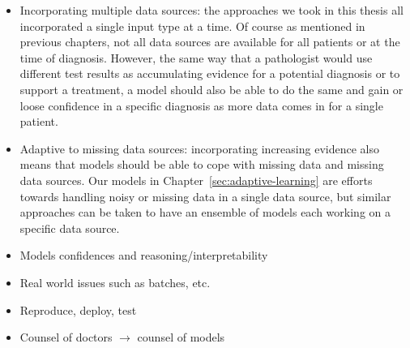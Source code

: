\begin{itemize}
  \item Incorporating multiple data sources: the approaches we took in this
    thesis all incorporated a single input type at a time. Of course as
    mentioned in previous chapters, not all data sources are available for all
    patients or at the time of diagnosis. However, the same way that a
    pathologist would use different test results as accumulating evidence for a
    potential diagnosis or to support a treatment, a model should also be able
    to do the same and gain or loose confidence in a specific diagnosis as more
    data comes in for a single patient.
  \item Adaptive to missing data sources: incorporating increasing evidence
    also means that models should be able to cope with missing data and missing
    data sources. Our models in Chapter~\ref{sec:adaptive-learning} are efforts
    towards handling noisy or missing data in a single data source, but similar
    approaches can be taken to have an ensemble of models each working on a
    specific data source.
  \item Models confidences and reasoning/interpretability
  \item Real world issues such as batches, etc.
  \item Reproduce, deploy, test
  \item Counsel of doctors $\rightarrow$ counsel of models
\end{itemize}
